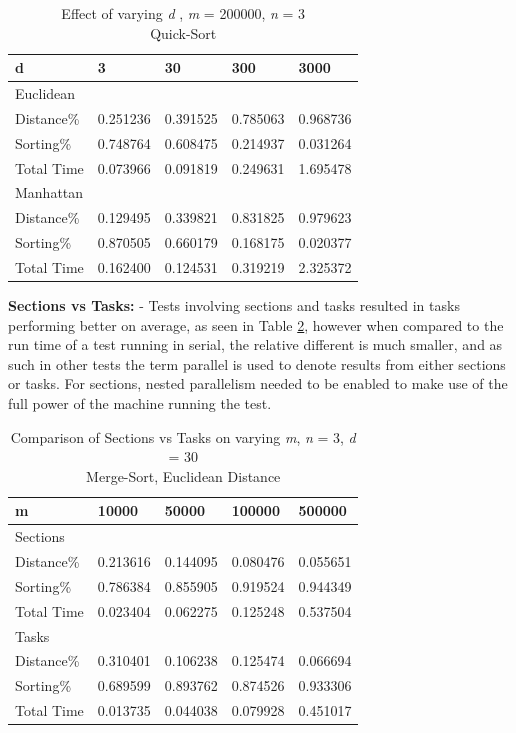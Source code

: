 \documentclass[a4paper,twoside,11pt]{report}
\begin{document}
\begin{table}[h]
\centering
		\begin{tabular}{lllll}
			\hline
			d          & 3        & 30       & 300      & 3000     \\\hline \hline
			Euclidean  &          &          &          &          \\\hline
			Distance\% & 0.251236 & 0.391525 & 0.785063 & 0.968736 \\
			Sorting\%  & 0.748764 & 0.608475 & 0.214937 & 0.031264 \\
			Total Time & 0.073966 & 0.091819 & 0.249631 & 1.695478 \\\hline
			Manhattan  &          &          &          &          \\\hline
			Distance\% & 0.129495 & 0.339821 & 0.831825 & 0.979623 \\
			Sorting\%  & 0.870505 & 0.660179 & 0.168175 & 0.020377 \\
			Total Time & 0.162400 & 0.124531 & 0.319219 & 2.325372\\\hline
		\end{tabular}%

	\caption{Effect of varying \textit{d} , \textit{m} = 200000, \textit{n} = 3\\
	Quick-Sort}
	\label{d1}
\end{table}

\textbf{Sections vs Tasks:} - Tests involving sections and tasks resulted in tasks performing better on average, as seen in Table \ref{svt}, however when compared to the run time of a test running in serial, the relative different is much smaller, and as such in other tests the term parallel is used to denote results from either sections or tasks. For sections, nested parallelism needed to be enabled to make use of the full power of the machine running the test.

\begin{table}[h]
	\centering
	\begin{tabular}{lllll}
		\hline
		m          & 10000    & 50000    & 100000   & 500000   \\ \hline \hline
		Sections   &          &          &          &          \\ \hline
		Distance\% & 0.213616 & 0.144095 & 0.080476 & 0.055651 \\
		Sorting\%  & 0.786384 & 0.855905 & 0.919524 & 0.944349 \\
		Total Time & 0.023404 & 0.062275 & 0.125248 & 0.537504 \\ \hline
		Tasks      &          &          &          &          \\ \hline
		Distance\% & 0.310401 & 0.106238 & 0.125474 & 0.066694 \\
		Sorting\%  & 0.689599 & 0.893762 & 0.874526 & 0.933306 \\
		Total Time & 0.013735 & 0.044038 & 0.079928 & 0.451017 \\ \hline
	\end{tabular}
	\caption{Comparison of Sections vs Tasks on varying \textit{m}, \textit{n} = 3, \textit{d} = 30\\
	Merge-Sort, Euclidean Distance}
	\label{svt}
\end{table}
\end{document}
